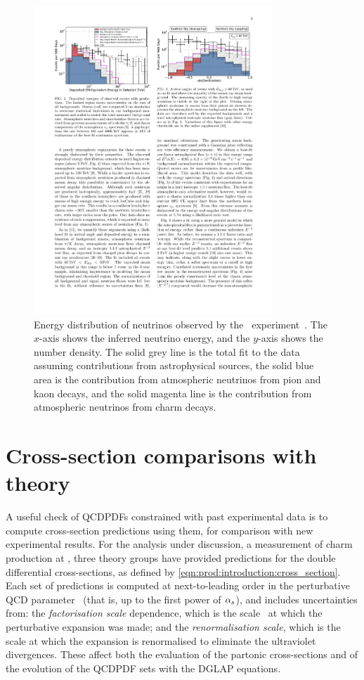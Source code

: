 \begin{figure}
  \centering
  \includegraphics[width=0.8\textwidth]{figures/production/icecube_energy_spectrum}
  \caption{%
    Energy distribution of neutrinos observed by the \icecube\ 
    experiment~\cite{Aartsen:2014gkd}.
    The $x$-axis shows the inferred neutrino energy, and the $y$-axis shows the 
    number density.
    The solid grey line is the total fit to the data assuming contributions 
    from astrophysical sources, the solid blue area is the contribution from 
    atmospheric neutrinos from pion and kaon decays, and the solid magenta line 
    is the contribution from atmospheric neutrinos from charm decays.
  }
  \label{fig:prod:theory:icecube_energy}
\end{figure}

\section{Cross-section comparisons with theory}
\label{chap:prod:theory:comparisons}

A useful check of \acp{QCDPDF} constrained with past experimental data is to 
compute cross-section predictions using them, for comparison with new 
experimental results.
For the analysis under discussion, a measurement of charm production at 
\sqrtseq{13}, three theory groups have provided predictions for the double 
differential cross-sections, as defined by 
\cref{eqn:prod:introduction:cross_section}.
Each set of predictions is computed at next-to-leading order in the 
perturbative \ac{QCD} parameter \alphas\ (that is, up to the first power of 
$\alpha_{s}$), and includes uncertainties from: the \emph{factorisation scale} 
dependence, which is the scale \pdfqsquared\ at which the perturbative 
expansion was made; and the \emph{renormalisation scale}, which is the scale at 
which the expansion is renormalised to eliminate the ultraviolet divergences.
These affect both the evaluation of the partonic cross-sections and of the 
evolution of the \ac{QCDPDF} sets with the \ac{DGLAP} equations.

